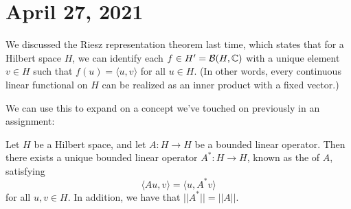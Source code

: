 \pagebreak\section{April 27, 2021}

We discussed the Riesz representation theorem last time, which states that for a Hilbert space $H$, we can identify each $f \in H' = \mathcal{B}(H, \mathbb C)$ with a unique element $v \in H$ such that $f(u) = \langle u, v \rangle$ for all $u \in H$. (In other words, every continuous linear functional on $H$ can be realized as an inner product with a fixed vector.) 

We can use this to expand on a concept we've touched on previously in an assignment:

\begin{theorem}
Let $H$ be a Hilbert space, and let $A: H \to H$ be a bounded linear operator. Then there exists a unique bounded linear operator $A^\ast: H \to H$, known as the  of $A$, satisfying 
\[
    \langle Au, v \rangle = \langle u, A^\ast v \rangle
\]
for all $u, v \in H$. In addition, we have that $||A^\ast|| = ||A||$.
\end{theorem}
